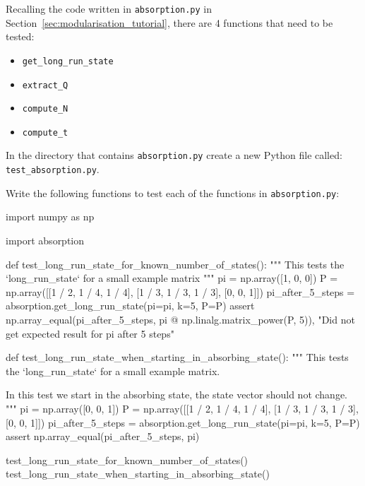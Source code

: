 Recalling the code written in \texttt{absorption.py} in
Section~\ref{sec:modularisation_tutorial},
there are 4 functions that need to be tested:

\begin{itemize}
\item 

\texttt{get\_long\_run\_state}

\item 

\texttt{extract\_Q}

\item 

\texttt{compute\_N}

\item 

\texttt{compute\_t}

\end{itemize}


In the directory that contains \texttt{absorption.py} create a new Python
file called: \texttt{test\_absorption.py}.


Write the following functions to test each of the functions in
\texttt{absorption.py}:

\begin{python}
import numpy as np

import absorption

def test_long_run_state_for_known_number_of_states():
    """
    This tests the `long_run_state` for a small example matrix
    """
    pi = np.array([1, 0, 0])
    P = np.array([[1 / 2, 1 / 4, 1 / 4], [1 / 3, 1 / 3, 1 / 3], [0, 0, 1]])
    pi_after_5_steps = absorption.get_long_run_state(pi=pi, k=5, P=P)
    assert np.array_equal(pi_after_5_steps, pi @ np.linalg.matrix_power(P, 5)), "Did not get expected result for pi after 5 steps"


def test_long_run_state_when_starting_in_absorbing_state():
    """
    This tests the `long_run_state` for a small example matrix.

    In this test we start in the absorbing state, the state vector should not
    change.
    """
    pi = np.array([0, 0, 1])
    P = np.array([[1 / 2, 1 / 4, 1 / 4], [1 / 3, 1 / 3, 1 / 3], [0, 0, 1]])
    pi_after_5_steps = absorption.get_long_run_state(pi=pi, k=5, P=P)
    assert np.array_equal(pi_after_5_steps, pi)


test_long_run_state_for_known_number_of_states()
test_long_run_state_when_starting_in_absorbing_state()
\end{python}


